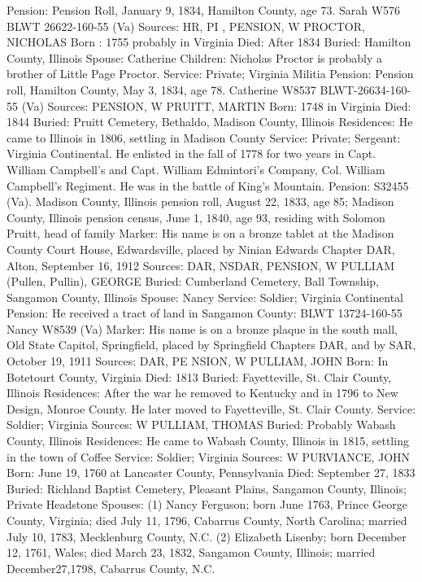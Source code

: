 Pension: Pension Roll, January 9, 1834, Hamilton County, age 73. Sarah W576 BLWT 26622-160-55 (Va) 
Sources: HR, PI , PENSION, W 
PROCTOR, NICHOLAS 
Born : 1755 probably in Virginia 
Died: After 1834 
Buried: Hamilton County, Illinois 
Spouse: Catherine 
Children: Nicholas Proctor is probably a brother of Little Page Proctor. 
Service: Private; Virginia Militia 
Pension: Pension roll, Hamilton County, May 3, 1834, age 78. Catherine W8537 ­BLWT-26634-160-55 (Va) 
Sources: PENSION, W 
PRUITT, MARTIN 
Born: 1748 in Virginia 
Died: 1844 
Buried: Pruitt Cemetery, Bethaldo, Madison County, Illinois 
Residences: He came to Illinois in 1806, settling in Madison County
Service: Private; Sergeant: Virginia Continental. He enlisted in the fall of 1778 for two years in Capt. William Campbell's and Capt. William Edmintori's Company, Col. William Campbell's Regiment. He was in the battle of King's Mountain. Pension: S32455 (Va). Madison County, Illinois pension roll, August 22, 1833, age 85; Madison County, Illinois pension census, June 1, 1840, age 93, residing with Solomon Pruitt, head of family
Marker: His name is on a bronze tablet at the Madison County Court House, Edwardsville, placed by Ninian Edwards Chapter DAR, Alton, September 16, 1912
Sources: DAR, NSDAR, PENSION, W 
PULLIAM (Pullen, Pullin), GEORGE 
Buried: Cumberland Cemetery, Ball Township, Sangamon County, Illinois 
Spouse: Nancy
Service: Soldier; Virginia Continental 
Pension: He received a tract of land in Sangamon County: BLWT 13724-160-55 Nancy W8539 (Va)
Marker: His name is on a bronze plaque in the south mall, Old State Capitol, Springfield, placed by Springfield Chapters DAR, and by SAR, October 19, 1911 
Sources: DAR, PE NSION, W 
PULLIAM, JOHN 
Born: In Botetourt County, Virginia 
Died: 1813 
Buried: Fayetteville, St. Clair County, Illinois 
Residences: After the war he removed to Kentucky and in 1796 to New Design, Monroe County. He later moved to Fayetteville, St. Clair County. 
Service: Soldier; Virginia 
Sources: W 
PULLIAM, THOMAS 
Buried: Probably Wabash County, Illinois 
Residences: He came to Wabash County, Illinois in 1815, settling in the town of Coffee
Service: Soldier; Virginia 
Sources: W 
PURVIANCE, JOHN 
Born: June 19, 1760 at Lancaster County, Pennsylvania 
Died: September 27, 1833 
Buried: Richland Baptist Cemetery, Pleasant Plains, Sangamon County, Illinois; Private Headstone 
Spouses:  (1) Nancy Ferguson; born June 1763, Prince George County, Virginia; died July 11, 1796, Cabarrus 			County, North Carolina; married July 10, 1783, Mecklenburg County, N.C. 
	(2) Elizabeth Lisenby; born December 12, 1761, Wales; died March 23, 1832, Sangamon County, 			Illinois; married December27,1798, Cabarrus County, N.C. 
